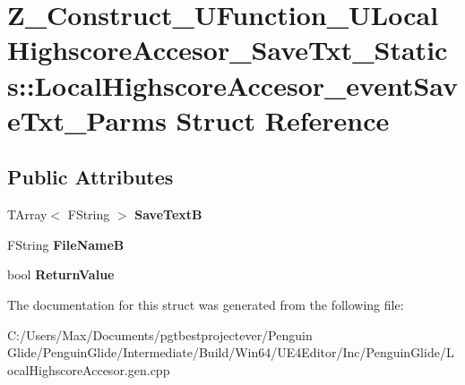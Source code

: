 \hypertarget{struct_z___construct___u_function___u_local_highscore_accesor___save_txt___statics_1_1_local_hig914a192ebe959b6f132c04f9610f193b}{}\section{Z\+\_\+\+Construct\+\_\+\+U\+Function\+\_\+\+U\+Local\+Highscore\+Accesor\+\_\+\+Save\+Txt\+\_\+\+Statics\+::Local\+Highscore\+Accesor\+\_\+event\+Save\+Txt\+\_\+\+Parms Struct Reference}
\label{struct_z___construct___u_function___u_local_highscore_accesor___save_txt___statics_1_1_local_hig914a192ebe959b6f132c04f9610f193b}
\subsection*{Public Attributes}
\begin{DoxyCompactItemize}
\item 
\mbox{\label{struct_z___construct___u_function___u_local_highscore_accesor___save_txt___statics_1_1_local_hig914a192ebe959b6f132c04f9610f193b_a189161c5cdabb2d18efc35c10282c90b}} 
T\+Array$<$ F\+String $>$ {\bfseries Save\+TextB}
\item 
\mbox{\label{struct_z___construct___u_function___u_local_highscore_accesor___save_txt___statics_1_1_local_hig914a192ebe959b6f132c04f9610f193b_a644de2dc8e7a242254b30fde325eb332}} 
F\+String {\bfseries File\+NameB}
\item 
\mbox{\label{struct_z___construct___u_function___u_local_highscore_accesor___save_txt___statics_1_1_local_hig914a192ebe959b6f132c04f9610f193b_a1c06fecea7768223385900e4659a19a2}} 
bool {\bfseries Return\+Value}
\end{DoxyCompactItemize}


The documentation for this struct was generated from the following file\+:\begin{DoxyCompactItemize}
\item 
C\+:/\+Users/\+Max/\+Documents/pgtbestprojectever/\+Penguin Glide/\+Penguin\+Glide/\+Intermediate/\+Build/\+Win64/\+U\+E4\+Editor/\+Inc/\+Penguin\+Glide/Local\+Highscore\+Accesor.\+gen.\+cpp\end{DoxyCompactItemize}
